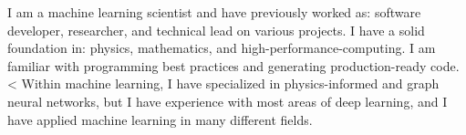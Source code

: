 



I am a machine learning scientist and have previously worked as: software developer, researcher, and technical lead on various projects.
I have a solid foundation in: physics, mathematics, and high-performance-computing.
I am familiar with programming best practices and generating production-ready code.<
Within machine learning, I have specialized in physics-informed and graph neural networks, but I have experience with most areas of deep learning, and I have applied machine learning in many different fields.



